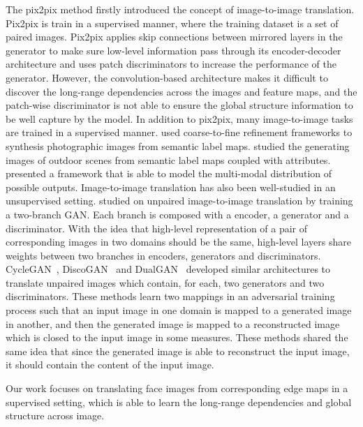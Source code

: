 The pix2pix method \cite{pix2pix} firstly introduced the concept of image-to-image translation. Pix2pix is train in a supervised manner, where the training dataset is a set of paired images. 
Pix2pix applies skip connections \cite{Unet} between mirrored layers in the generator to make sure low-level information pass through its encoder-decoder architecture and uses patch discriminators to increase the performance of the generator. However, the convolution-based architecture makes it difficult to discover the long-range dependencies across the images and feature maps, and the patch-wise discriminator is not able to ensure the global structure information to be well capture by the model.
%
In addition to pix2pix, many image-to-image tasks are trained in a supervised manner. 
\cite{CascadedGANs, pix2pixHD} used coarse-to-fine refinement frameworks to synthesis photographic images from semantic label maps. 
\cite{outdoor_scene} studied the generating images of outdoor scenes from semantic label maps coupled with attributes.
\cite{BicycleGANs} presented a framework that is able to model the multi-modal distribution of possible outputs.
%
%
Image-to-image translation has also been well-studied in an unsupervised setting.
\cite{UNIT} studied on unpaired image-to-image translation by training a two-branch GAN. Each branch is composed with a encoder, a generator and a discriminator. With the idea that high-level representation of a pair of corresponding images in two domains should be the same, high-level layers share weights between two branches in encoders, generators and discriminators. 
%
CycleGAN~\cite{CycleGANs}, DiscoGAN~\cite{DiscoGANs} and DualGAN~\cite{DualGANs} developed similar architectures to translate unpaired images which contain, for each, two generators and two discriminators. These methods learn two mappings in an adversarial training process such that an input image in one domain is mapped to a generated image in another, and then the generated image is mapped to a reconstructed image which is closed to the input image in some measures. These methods shared the same idea that since the generated image is able to reconstruct the input image, it should contain the content of the input image. 

Our work focuses on translating face images from corresponding edge maps in a supervised setting, which is able to learn the long-range dependencies and global structure across image.

